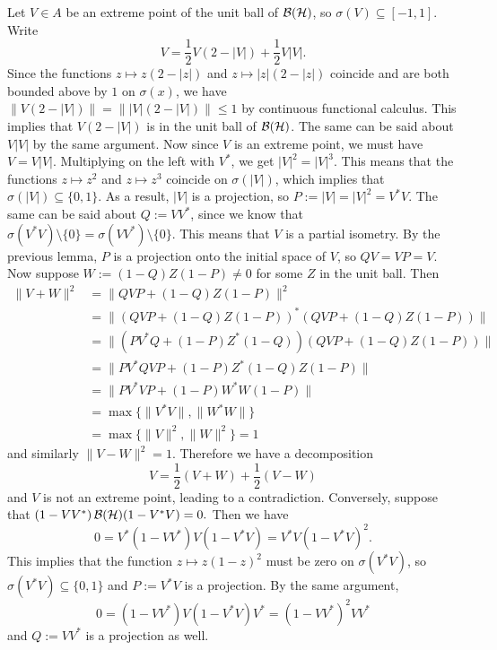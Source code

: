 \begin{myproof}
  Let $V \in A$ be an extreme point of the unit ball of $\operatorname{\mathcal{B} (\mathcal{H})}$, so $\sigma (V) \subseteq [-1, 1]$. Write 
  $$V = \frac{1}{2} V (2 - |V|) + \frac{1}{2} V |V|.$$
  Since the functions $z \mapsto z (2 - |z|)$ and $z \mapsto |z| (2 - |z|)$ coincide and are both bounded above by $1$ on $\sigma(x)$,
  we have $\| V (2 - |V|)\| = \| |V| (2 - |V|)\| \leq 1$ by continuous functional calculus.
  This implies that $V (2 - |V|)$ is in the unit ball of $\operatorname{\mathcal{B} (\mathcal{H})}$. The same can be said about $V |V|$ by the same argument.
  Now since $V$ is an extreme point, we must have $V = V |V|$. Multiplying on the left with $V^*$, 
  we get $|V|^2 = |V|^3$. This means that the functions $z \mapsto z^2$ and $z \mapsto z^3$ coincide on $\sigma (|V|)$,
  which implies that $\sigma (|V|) \subseteq \{0, 1\}$. As a result, $|V|$ is a projection, so $P := |V| = |V|^2 = V^* V$.
  The same can be said about $Q := V V^*$, since we know that $\sigma (V^* V) \setminus \{0\} = \sigma (V V^*) \setminus \{0\}$. 
  This means that $V$ is a partial isometry. By the previous lemma, $P$ is a projection onto the initial space of 
  $V$, so $QV = VP = V$. Now suppose $W := (1 - Q) Z (1 - P) \neq 0$ for some $Z$ in the unit ball.
  Then 
  \begin{align*}
     \| V + W\|^2 &= \| QVP + (1 - Q)Z(1 - P) \|^2\\
     &= \|( QVP + (1 - Q)Z(1 - P))^* ( QVP + (1 - Q)Z(1 - P))\|\\
     &= \| (P V^* Q + (1 - P)Z^*(1 - Q)) (QVP + (1 - Q)Z(1 - P))\|\\
     &= \| P V^* Q V P + (1 - P) Z^* (1 - Q) Z (1 - P)\|\\
     &= \| P V^* V P + (1 - P) W^* W (1 - P)\|\\
     &= \max \{\|V^* V\|, \|W^* W\|\}\\
     &= \max \{\|V\|^2, \| W\|^2\} = 1
  \end{align*}
  and similarly $\| V - W\|^2 = 1$. Therefore we have a decomposition 
  $$V = \frac{1}{2} (V + W) + \frac{1}{2} (V - W)$$
  and $V$ is not an extreme point, leading to a contradiction. Conversely, suppose that 
  $(1 - V V^*) \operatorname{\mathcal{B} (\mathcal{H})} (1 - V^* V) = 0.$ Then we have 
  $$0 = V^* (1 - V V^*) V (1 - V^* V) = V^* V (1 - V^* V)^2.$$
  This implies that the function $z \mapsto z( 1 - z)^2$ must be zero on $\sigma (V^* V)$, so 
  $\sigma (V^* V) \subseteq \{0, 1\}$ and $P := V^* V$ is a projection. By the same argument,
  $$0 = (1 - V V^*) V (1 - V^* V)V^* =(1 - V V^*)^2  V V^*$$ and $Q := V V^*$ is a projection as well.

\end{myproof}
